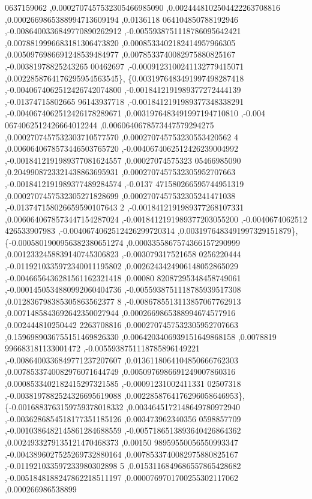 \begin{DoxyCode}
      0637159062 ,0.0002707457532305466985090 ,0.0024448102504422263708816 ,0.0002669865388994713609194 ,0.0136118
      064104850788192946 ,-0.0086400336849770890262912 ,-0.0055938751118786095642421 ,0.0078819996683181306473820 
      ,0.0008533402182414957966305 ,0.0050976986691248539484977 ,0.0078533740082975880825167 ,-0.00381978825243265
      00462697 ,-0.0009123100241132779415071 ,0.0022858764176295954563545\},
\{0.0031976483491997498287418 ,-0.0040674062512426742074800 ,-0.0018412191989377272444139 ,-0.01374715802665
      96143937718 ,-0.0018412191989377348338291 ,-0.0040674062512426178289671 ,0.0031976483491997194710810 ,-0.004
      0674062512426664012244 ,0.0060640678573447579294275 ,0.0002707457532303710577570 ,0.000270745753230553420562
      4 ,0.0060640678573446503765720 ,-0.0040674062512426239004992 ,-0.0018412191989377081624557 ,0.00027074575323
      05466985090 ,0.2049908723321438863695931 ,0.0002707457532305952707663 ,-0.0018412191989377489284574 ,-0.0137
      471580266595744951319 ,0.0002707457532305271828699 ,0.0002707457532305241471038 ,-0.013747158026659590107643
      2 ,-0.0018412191989377268107331 ,0.0060640678573447154287024 ,-0.0018412191989377203055200 ,-0.0040674062512
      426533907983 ,-0.0040674062512426299720314 ,0.0031976483491997329151879\},
\{-0.0005801900956382380651274 ,0.0003355867574366157290999 ,0.0012332458839140745306823 ,-0.003079317521658
      0256220444 ,-0.0119210335972340011195802 ,0.0026243424906148052865029 ,-0.0046656436281561162321418 ,0.00080
      82087295348458749061 ,-0.0001450534880992060404736 ,-0.0055938751118785939517308 ,0.012836798385305863562377
      8 ,-0.0086785513113857067762913 ,0.0071485843692642350027944 ,0.0002669865388994674577916 ,0.002444810250442
      2263708816 ,0.0002707457532305952707663 ,0.1596989036755151469826330 ,0.0064203406939151649868158 ,0.0078819
      996683181133001472 ,-0.0055938751118785896149221 ,-0.0086400336849771237207607 ,0.0136118064104850666762303 
      ,0.0078533740082976071644749 ,0.0050976986691249007860316 ,0.0008533402182415297321585 ,-0.00091231002411331
      02507318 ,-0.0038197882524326695619088 ,0.0022858764176296058646953\},
\{-0.0016883763159759378018332 ,0.0034645172148649780972940 ,-0.0036286854518177351185126 ,0.003473962340356
      0598857709 ,-0.0010386482145861284688559 ,-0.0057186513893640426864362 ,0.0024933279135121470468373 ,0.00150
      98959550056550993347 ,-0.0043896027525269732880164 ,0.0078533740082975880825167 ,-0.011921033597233980302898
      5 ,0.0153116849686557865428682 ,-0.0051848188247862218511197 ,0.0000769701700255302117062 ,0.000266986538899

\end{DoxyCode}
